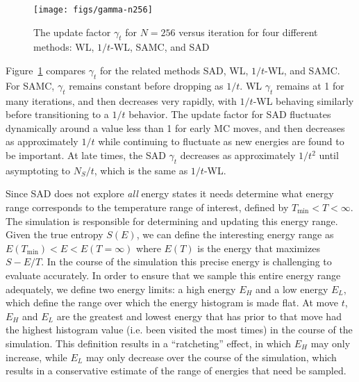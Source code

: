 \documentclass[letterpaper,twocolumn,amsmath,amssymb,pre,aps,10pt]{revtex4-1}
\begin{document}
\begin{figure}
  \texttt{[image: figs/gamma-n256]}
  \caption{The update factor $\gamma_t$ for $N=256$ versus
    iteration for four different methods: WL, $1/t$-WL, SAMC, and SAD}
    \label{fig:gamma-vs-t}
\end{figure}
Figure~\ref{fig:gamma-vs-t} compares $\gamma_t$ for the related methods
SAD, WL, $1/t$-WL, and SAMC.  For SAMC, $\gamma_t$ remains constant
before dropping as $1/t$.  WL $\gamma_t$ remains at 1 for many iterations,
and then decreases very rapidly, with $1/t$-WL behaving similarly before
transitioning to a $1/t$ behavior.
The update factor for SAD fluctuates
dynamically around a value less than 1 for early MC moves, and then
decreases as approximately $1/t$ while continuing to fluctuate as 
new energies are found to be important.  At late times, the SAD $\gamma_t$
decreases as approximately $1/t^2$ until asymptoting to $N_S/t$, which
is the same as $1/t$-WL.

Since SAD does not explore \emph{all} energy states it needs determine
what energy range corresponds to the temperature range of interest,
defined by $T_{\min}<T<\infty$.
The
simulation is responsible for determining and updating this energy
range.
Given the true entropy $S(E)$, we can define the interesting energy
range as
  $E(T_{\min}) <E< E(T=\infty)$
where $E(T)$ is the energy that maximizes $S-E/T$.  In the course of the
simulation this precise energy is challenging to evaluate accurately.
In order to ensure that we sample this entire energy range adequately,
we define two energy limits:  a high energy $E_H$ and a low
energy $E_L$, which define the range over which the energy histogram
is made flat. At move $t$, $E_H$ and $E_L$ are the greatest and lowest
energy that has prior to that move
had the highest histogram value (i.e. been visited the most times) in
the course of the simulation.
This definition results in a ``ratcheting'' effect, in which $E_H$
may only increase, while $E_L$ may only decrease over the course of the
simulation, which results in a conservative estimate of the range of
energies that need be sampled.
\end{document}

